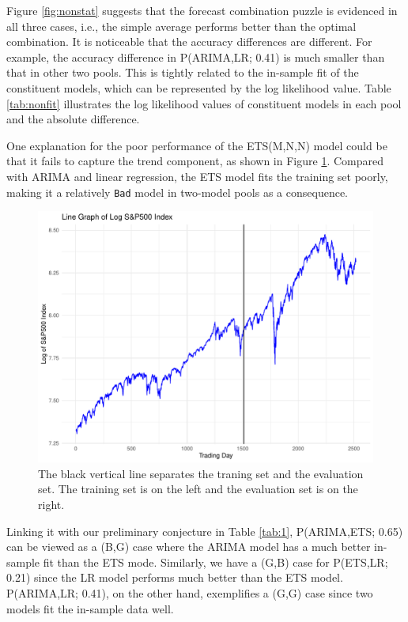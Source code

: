 \documentclass{monashthesis}
\begin{document}
Figure \ref{fig:nonstat} suggests that the forecast combination puzzle is evidenced in all three cases, i.e., the simple average performs better than the optimal combination. It is noticeable that the accuracy differences are different. For example, the accuracy difference in P(ARIMA,LR; 0.41) is much smaller than that in other two pools. This is tightly related to the in-sample fit of the constituent models, which can be represented by the log likelihood value. Table \ref{tab:nonfit} illustrates the log likelihood values of constituent models in each pool and the absolute difference.

One explanation for the poor performance of the ETS(M,N,N) model could be that it fails to capture the trend component, as shown in Figure \ref{fig:llg}. Compared with ARIMA and linear regression, the ETS model fits the training set poorly, making it a relatively \texttt{Bad} model in two-model pools as a consequence.

\begin{figure}[ht]
\centering
\includegraphics[scale=0.5]{figures/log_linegraph.pdf}
\caption{The black vertical line separates the traning set and the evaluation set. The training set is on the left and the evaluation set is on the right.}
\label{fig:llg}
\end{figure}

Linking it with our preliminary conjecture in Table \ref{tab:1}, P(ARIMA,ETS; 0.65) can be viewed as a (B,G) case where the ARIMA model has a much better in-sample fit than the ETS mode. Similarly, we have a (G,B) case for P(ETS,LR; 0.21) since the LR model performs much better than the ETS model. P(ARIMA,LR; 0.41), on the other hand, exemplifies a (G,G) case since two models fit the in-sample data well.
\end{document}
